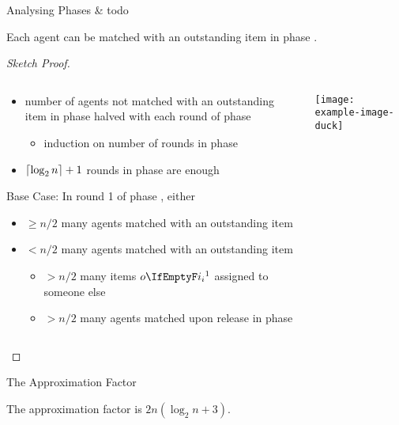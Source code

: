 \begin{frame}{Analysing Phases \phasei{} \& \phaseiii \Dash todo}
	\adjustfortopblock
	\begin{lemma}[15]
		Each agent can be matched with an outstanding item in phase \phaseiii.
	\end{lemma}
	\begin{proof}[Sketch Proof]
		\begin{columns}[T]
			\begin{column}{0.6\textwidth}
				\begin{itemize}
					\item
					number of agents not matched with an outstanding item in phase \phaseiii{} halved with each round of phase \phasei
					\begin{itemize}
						\item
						induction on number of rounds in phase \phasei
					\end{itemize}

					\item
					\(\lceil\log_2 n\rceil + 1\) rounds in phase \phasei{} are enough
				\end{itemize}
				Base Case: In round 1 of phase \phasei, either
				\begin{itemize}
					\item
					\(\ge n/2\) many agents matched with an outstanding item

					\item
					\(< n/2\) many agents matched with an outstanding item
					\begin{itemize}
						\item
						\(> n/2\) many items \(\asgd*{1}\) assigned to someone else

						\item
						\(> n/2\) many agents matched upon release in phase \phaseiii
					\end{itemize}
				\end{itemize}
			\end{column}
			\begin{column}{0.375\textwidth}
				\texttt{[image: example-image-duck]}
			\end{column}
		\end{columns}
		\vspace{-2ex}
	\end{proof}
\end{frame}





\begin{frame}{The Approximation Factor}
	\begin{theorem}[16]
		The approximation factor is \(2n ( \log_2 n + 3 ) \).
	\end{theorem}
\end{frame}